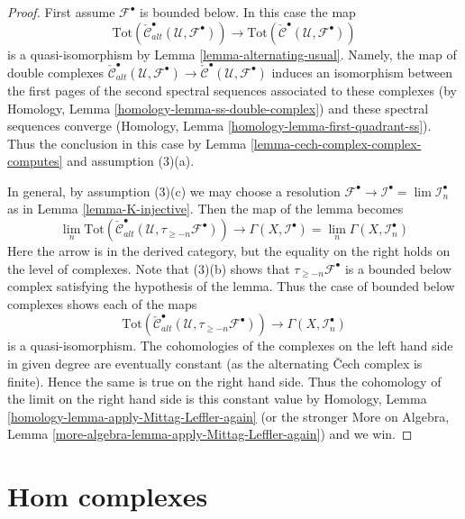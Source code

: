 \begin{proof}
First assume $\mathcal{F}^\bullet$ is bounded below. In this case the map
$$
\text{Tot}(\check{\mathcal{C}}^\bullet_{alt}(\mathcal{U}, \mathcal{F}^\bullet))
\longrightarrow
\text{Tot}(\check{\mathcal{C}}^\bullet(\mathcal{U}, \mathcal{F}^\bullet))
$$
is a quasi-isomorphism by Lemma \ref{lemma-alternating-usual}.
Namely, the map of double complexes
$\check{\mathcal{C}}^\bullet_{alt}(\mathcal{U}, \mathcal{F}^\bullet) \to
\check{\mathcal{C}}^\bullet(\mathcal{U}, \mathcal{F}^\bullet)$
induces an isomorphism between the first pages of the second spectral sequences
associated to these complexes
(by Homology, Lemma \ref{homology-lemma-ss-double-complex})
and these spectral sequences converge
(Homology, Lemma \ref{homology-lemma-first-quadrant-ss}).
Thus the conclusion in this case by
Lemma \ref{lemma-cech-complex-complex-computes} and assumption (3)(a).

\medskip\noindent
In general, by assumption (3)(c) we may choose a resolution
$\mathcal{F}^\bullet \to \mathcal{I}^\bullet = \lim \mathcal{I}_n^\bullet$
as in Lemma \ref{lemma-K-injective}.
Then the map of the lemma becomes
$$
\lim_n 
\text{Tot}(\check{\mathcal{C}}^\bullet_{alt}(\mathcal{U},
\tau_{\geq -n}\mathcal{F}^\bullet))
\longrightarrow
\Gamma(X, \mathcal{I}^\bullet) =
\lim_n \Gamma(X, \mathcal{I}_n^\bullet)
$$
Here the arrow is in the derived category, but the equality on the
right holds on the level of complexes.
Note that (3)(b) shows that $\tau_{\geq -n}\mathcal{F}^\bullet$
is a bounded below complex satisfying the hypothesis of the lemma.
Thus the case of bounded below complexes shows each of the maps
$$
\text{Tot}(\check{\mathcal{C}}^\bullet_{alt}(\mathcal{U},
\tau_{\geq -n}\mathcal{F}^\bullet))
\longrightarrow
\Gamma(X, \mathcal{I}_n^\bullet)
$$
is a quasi-isomorphism. The cohomologies of the complexes on the left
hand side in given degree are eventually
constant (as the alternating {\v C}ech complex is finite).
Hence the same is true on the right hand side.
Thus the cohomology of the limit on the right hand side is
this constant value by
Homology, Lemma \ref{homology-lemma-apply-Mittag-Leffler-again}
(or the stronger More on Algebra, Lemma
\ref{more-algebra-lemma-apply-Mittag-Leffler-again})
and we win.
\end{proof}






\section{Hom complexes}
\label{section-hom-complexes}

